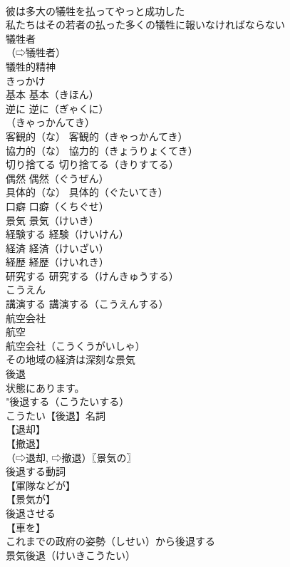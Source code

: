 \documentclass[8pt]{extreport}
\begin{document}
\begin{CJK}{UTF8}{min}
\\	彼は多大の犠牲を払ってやっと成功した
\\	私たちはその若者の払った多くの犠牲に報いなければならない
\\	犠牲者
\\	（⇨犠牲者）
\\	犠牲的精神
\\	きっかけ		
\\	基本		基本（きほん）
\\	逆に		逆に（ぎゃくに）
\\	（きゃっかんてき）
\\	客観的（な）		客観的（きゃっかんてき）
\\	協力的（な）		協力的（きょうりょくてき）
\\	切り捨てる		切り捨てる（きりすてる）
\\	偶然		偶然（ぐうぜん）
\\	具体的（な）		具体的（ぐたいてき）
\\	口癖		口癖（くちぐせ）
\\	景気		景気（けいき）
\\	経験する		経験（けいけん）
\\	経済		経済（けいざい）
\\	経歴		経歴（けいれき）
\\	研究する		研究する（けんきゅうする）
\\	こうえん
\\	講演する		講演する（こうえんする）
\\	航空会社		
\\	航空 
\\	航空会社（こうくうがいしゃ）
\\	その地域の経済は深刻な景気
\\	後退
\\	状態にあります。
\\	"後退する（こうたいする）
\\	こうたい【後退】名詞
\\	【退却】
\\	【撤退】
\\	（⇨退却, ⇨撤退）〖景気の〗
\\	後退する動詞
\\	【軍隊などが】
\\	【景気が】
\\	後退させる
\\	【車を】
\\	これまでの政府の姿勢（しせい）から後退する
\\	景気後退（けいきこうたい）

\end{CJK}
\end{document}
